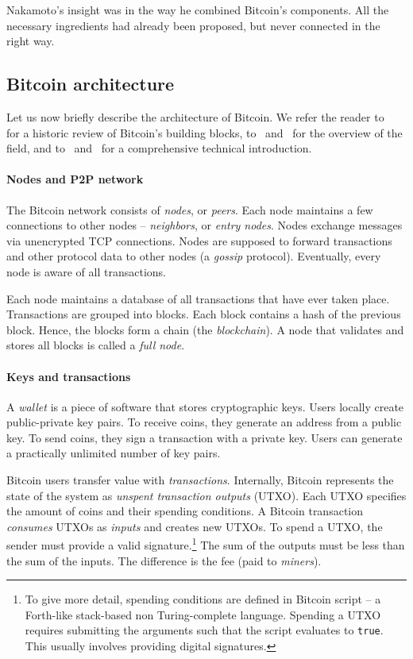 Nakamoto's insight was in the way he combined Bitcoin's components.
All the necessary ingredients had already been proposed, but never connected in the right way.


\subsection{Bitcoin architecture}

Let us now briefly describe the architecture of Bitcoin.
We refer the reader to~\cite{Narayanan2017} for a historic review of Bitcoin's building blocks, to~\cite{Bonneau2015} and~\cite{Tschorsch2016} for the overview of the field, and to~\cite{Narayanan2016} and~\cite{Antonopoulos2014} for a comprehensive technical introduction.

\paragraph{Nodes and P2P network}

The Bitcoin network consists of \textit{nodes}, or \textit{peers}.
Each node maintains a few connections to other nodes -- \textit{neighbors}, or \textit{entry nodes}.
Nodes exchange messages via unencrypted TCP connections.
Nodes are supposed to forward transactions and other protocol data to other nodes (a \textit{gossip} protocol).
Eventually, every node is aware of all transactions.

Each node maintains a database of all transactions that have ever taken place.
Transactions are grouped into blocks.
Each block contains a hash of the previous block.
Hence, the blocks form a chain (the \textit{blockchain}).
A node that validates and stores all blocks is called a \textit{full node}.

\paragraph{Keys and transactions}

A \textit{wallet} is a piece of software that stores cryptographic keys.
Users locally create public-private key pairs.
To receive coins, they generate an address from a public key.
To send coins, they sign a transaction with a private key.
Users can generate a practically unlimited number of key pairs.

Bitcoin users transfer value with \textit{transactions}.
Internally, Bitcoin represents the state of the system as \textit{unspent transaction outputs} (UTXO).
Each UTXO specifies the amount of coins and their spending conditions.
A Bitcoin transaction \textit{consumes} UTXOs as \textit{inputs} and creates new UTXOs.
To spend a UTXO, the sender must provide a valid signature.\footnote{To give more detail, spending conditions are defined in Bitcoin script -- a Forth-like stack-based non Turing-complete language.
Spending a UTXO requires submitting the arguments such that the script evaluates to \texttt{true}.
This usually involves providing digital signatures.}
The sum of the outputs must be less than the sum of the inputs.
The difference is the fee (paid to \textit{miners}).

